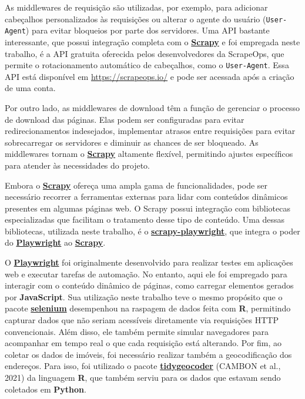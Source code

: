 \documentclass[
  12pt,
  a4paper,
]{scrreprt}
\begin{document}
\vspace{12pt}

As middlewares de requisição são utilizadas, por exemplo, para adicionar
cabeçalhos personalizados às requisições ou alterar o agente do usuário
(\texttt{User-Agent}) para evitar bloqueios por parte dos servidores.
Uma API bastante interessante, que possui integração completa com o
\href{https://docs.scrapy.org/en/latest}{\textbf{Scrapy}} e foi
empregada neste trabalho, é a API gratuita oferecida pelos
desenvolvedores da ScrapeOps, que permite o rotacionamento automático de
cabeçalhos, como o \texttt{User-Agent}. Essa API está disponível em
\url{https://scrapeops.io/} e pode ser acessada após a criação de uma
conta.

\vspace{12pt}

Por outro lado, as middlewares de download têm a função de gerenciar o
processo de download das páginas. Elas podem ser configuradas para
evitar redirecionamentos indesejados, implementar atrasos entre
requisições para evitar sobrecarregar os servidores e diminuir as
chances de ser bloqueado. As middlewares tornam o
\href{https://docs.scrapy.org/en/latest}{\textbf{Scrapy}} altamente
flexível, permitindo ajustes específicos para atender às necessidades do
projeto.

\vspace{12pt}

Embora o \href{https://docs.scrapy.org/en/latest}{\textbf{Scrapy}}
ofereça uma ampla gama de funcionalidades, pode ser necessário recorrer
a ferramentas externas para lidar com conteúdos dinâmicos presentes em
algumas páginas web. O Scrapy possui integração com bibliotecas
especializadas que facilitam o tratamento desse tipo de conteúdo. Uma
dessas bibliotecas, utilizada neste trabalho, é o
\href{https://github.com/scrapy-plugins/scrapy-playwright}{\textbf{scrapy-playwright}},
que integra o poder do
\href{https://playwright.dev/python/}{\textbf{Playwright}} ao
\href{https://docs.scrapy.org/en/latest}{\textbf{Scrapy}}.

\vspace{12pt}

O \href{https://playwright.dev/python/}{\textbf{Playwright}} foi
originalmente desenvolvido para realizar testes em aplicações web e
executar tarefas de automação. No entanto, aqui ele foi empregado para
interagir com o conteúdo dinâmico de páginas, como carregar elementos
gerados por \textbf{JavaScript}. Sua utilização neste trabalho teve o
mesmo propósito que o pacote
\href{https://cran.r-project.org/web/packages/selenium/index.html}{\textbf{selenium}}
desempenhou na raspagem de dados feita com \textbf{R}, permitindo
capturar dados que não seriam acessíveis diretamente via requisições
HTTP convencionais. Além disso, ele também permite simular navegadores
para acompanhar em tempo real o que cada requisição está alterando. Por
fim, ao coletar os dados de imóveis, foi necessário realizar também a
geocodificação dos endereços. Para isso, foi utilizado o pacote
\href{https://jessecambon.github.io/tidygeocoder/}{\textbf{tidygeocoder}}
(CAMBON et al., 2021) da linguagem \textbf{R}, que também serviu para os
dados que estavam sendo coletados em \textbf{Python}.
\end{document}
